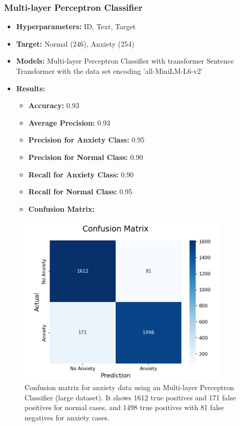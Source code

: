 \documentclass[runningheads,a4paper,11pt]{report}
\begin{document}
\vspace{0.5cm} %

\subsubsection{Multi-layer Perceptron Classifier}
\label{section:mpl}

\begin{itemize}
    \item \textbf{Hyperparameters:} ID, Text, Target
    \item \textbf{Target:} Normal (246), Anxiety (254)
    \item \textbf{Models:} Multi-layer Perceptron Classifier with transformer Sentence Transformer with the data set encoding 'all-MiniLM-L6-v2'
    \item \textbf{Results:}
    \begin{itemize}
        \item \textbf{Accuracy:} 0.93
        \item \textbf{Average Precision:} 0.93
        \item \textbf{Precision for Anxiety Class:} 0.95
        \item \textbf{Precision for Normal Class:} 0.90
        \item \textbf{Recall for Anxiety Class:} 0.90
        \item \textbf{Recall for Normal Class:} 0.95
        \item \textbf{Confusion Matrix:}
    \end{itemize}
\end{itemize}

\begin{figure}[h]
\centering
\includegraphics[width=0.9\textwidth]{Anxiety-Data-MLPClassifier.jpg}
\caption[Confusion matrix for anxiety data (Multi-layer Perceptron Classifier)]{Confusion matrix for anxiety data using an Multi-layer Perceptron Classifier (large dataset). It shows 1612 true positives and 171 false positives for normal cases, and 1498 true positives with 81 false negatives for anxiety cases.}
\end{figure}
\end{document}
